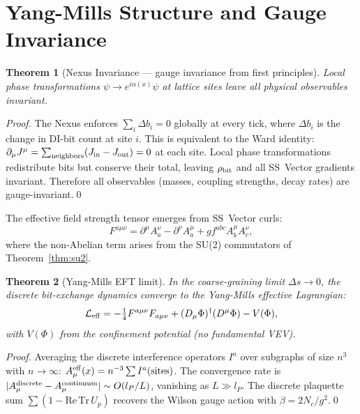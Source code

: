 \documentclass[11pt,a4paper]{article}
\newtheorem{theorem}{Theorem}[section]
\newcommand{\lP}{l_P}
\begin{document}
\section{Yang-Mills Structure and Gauge Invariance}

\begin{theorem}[Nexus Invariance --- gauge invariance from first principles]
\label{thm:nexus}
Local phase transformations $\psi \to e^{i\alpha(x)}\psi$ at lattice
sites leave all physical observables invariant.
\end{theorem}

\begin{proof}
The Nexus enforces $\sum_i \Delta b_i = 0$ globally at every tick,
where $\Delta b_i$ is the change in DI-bit count at site $i$.  This
is equivalent to the Ward identity: $\partial_\mu J^\mu
= \sum_{\rm neighbors}(J_{\rm in} - J_{\rm out}) = 0$ at each site.
Local phase transformations redistribute bits but conserve their
total, leaving $\rho_{\rm bit}$ and all SS~Vector gradients invariant.
Therefore all observables (masses, coupling strengths, decay rates)
are gauge-invariant.\qed
\end{proof}

The effective field strength tensor emerges from SS~Vector curls:
\begin{equation}
F^{a\mu\nu}
= \partial^\mu A^\nu_a - \partial^\nu A^\mu_a + g f^{abc}A^\mu_b A^\nu_c,
\label{eq:Fmunu}
\end{equation}
where the non-Abelian term arises from the SU(2) commutators of
Theorem~\ref{thm:su2}.

\begin{theorem}[Yang-Mills EFT limit]
\label{thm:ym}
In the coarse-graining limit $\Delta s \to 0$, the discrete bit-exchange
dynamics converge to the Yang-Mills effective Lagrangian:
\begin{equation}
\mathcal{L}_{\rm eff}
= -\tfrac{1}{4}F^{a\mu\nu}F_{a\mu\nu}
  + (D_\mu\Phi)^\dagger(D^\mu\Phi) - V(\Phi),
\label{eq:Leff}
\end{equation}
with $V(\Phi)$ from the confinement potential (no fundamental VEV).
\end{theorem}

\begin{proof}
Averaging the discrete interference operators $I^a$ over subgraphs of
size $n^3$ with $n\to\infty$: $A_\mu^{\rm eff}(x) = n^{-3}\sum I^a
(\text{sites})$.  The convergence rate is $|A_\mu^{\rm discrete}
- A_\mu^{\rm continuum}| \sim O(\lP/L)$, vanishing as $L\gg\lP$.
The discrete plaquette sum $\sum(1-\mathrm{Re\,Tr}\,U_p)$ recovers
the Wilson gauge action with $\beta = 2N_c/g^2$.\qed
\end{proof}
\end{document}
